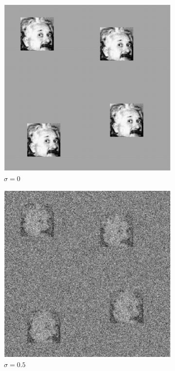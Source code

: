 \documentclass[12pt]{article}
\newcommand{\1}{\mathbf{1}}
\theoremstyle{plain}
\theoremstyle{definition}
\theoremstyle{remark}
\theoremstyle{plain}
\theoremstyle{remark}
\theoremstyle{plain}
\theoremstyle{plain}
\begin{document}
\begin{figure}[t]
	\centering
	\begin{subfigure}[h]{0.33\linewidth}
		\centering
		\includegraphics[width=.8\linewidth]{micrograph_Einstein_example_clean}
		\caption{$\sigma = 0$}
	\end{subfigure}%
	\begin{subfigure}[h]{0.33\linewidth}
		\centering
		\includegraphics[width=.8\linewidth]{micrograph_Einstein_example_s05}
		\caption{$\sigma = 0.5$}
	\end{subfigure}
	\begin{subfigure}[h]{0.33\linewidth}

\end{subfigure}
\end{figure}
\end{document}
